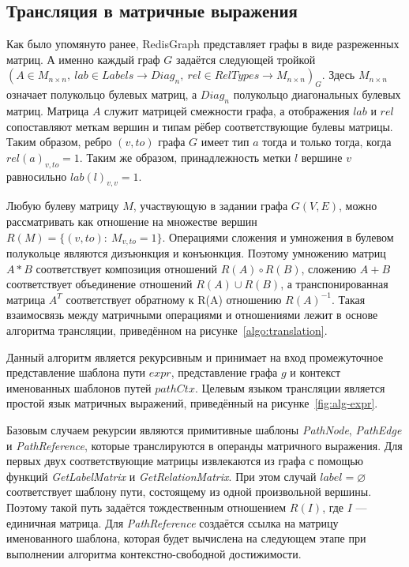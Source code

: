 \documentclass[14pt]{matmex-diploma-custom}
\begin{document}
\newpage
\subsection{Трансляция в матричные выражения}
Как было упомянуто ранее, RedisGraph представляет графы в виде разреженных матриц. А именно каждый граф $G$ задаётся следующей тройкой $(A \in M_{n\times n},~lab \in Labels \rightarrow Diag_n,~rel \in RelTypes \rightarrow M_{n \times n})_G$. Здесь $M_{n \times n}$ означает полукольцо булевых матриц, а $Diag_n$ полукольцо диагональных булевых матриц. Матрица $A$ служит матрицей смежности графа, а отображения $lab$ и $rel$ сопоставляют меткам вершин и типам рёбер соответствующие булевы матрицы. Таким образом, ребро $(v, to)$ графа $G$ имеет тип $a$ тогда и только тогда, когда $rel(a)_{v,to} = 1$.  Таким же образом, принадлежность метки $l$ вершине $v$ равносильно $lab(l)_{v,v}=1$.

Любую булеву матрицу $M$, участвующую в задании графа $G(V, E)$, можно рассматривать как отношение на множестве вершин $R(M) = \{(v, to):~M_{v,to}=1\}$. Операциями сложения и умножения в булевом полукольце являются дизъюнкция и конъюнкция. Поэтому умножению матриц $A*B$ соответствует композиция отношений $R(A) \circ R(B)$, сложению $A+B$ соответствует объединение отношений $R(A) \cup R(B)$, а транспонированная матрица $A^T$ соответствует обратному к R(A) отношению $R(A)^{-1}$. Такая взаимосвязь между матричными операциями и отношениями лежит в основе алгоритма трансляции, приведённом на рисунке~\ref{algo:translation}.

Данный алгоритм является рекурсивным и принимает на вход промежуточное представление шаблона пути $expr$, представление графа $g$ и контекст именованных шаблонов путей $pathCtx$. Целевым языком трансляции является простой язык матричных выражений, приведённый на рисунке~\ref{fig:alg-expr}.

Базовым случаем рекурсии являются примитивные шаблоны \textit{Path\-Node}, \textit{PathEdge} и \textit{PathReference}, которые транслируются в операнды матричного выражения. Для первых двух соответствующие матрицы извлекаются из графа с помощью функций \textit{GetLabel\-Matrix} и \textit{GetRelation\-Matrix}. При этом случай $label = \varnothing$ соответствует шаблону пути, состоящему из одной произвольной вершины. Поэтому такой путь задаётся тождественным отношением $R(I)$, где $I$ --- единичная матрица. Для \textit{Path\-Reference} создаётся ссылка на матрицу именованного шаблона, которая будет вычислена на следующем этапе при выполнении алгоритма контекстно-свободной достижимости.
\end{document}
